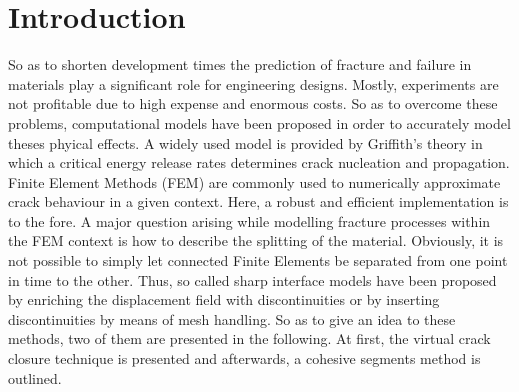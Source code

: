 \section{Introduction} \label{sec:intro}

So as to shorten development times the prediction of fracture and failure in materials play a significant role for engineering designs. Mostly, experiments are not profitable due to high expense and enormous costs. So as to overcome these problems, computational models have been proposed in order to accurately model theses phyical effects. A widely used model is provided by  Griffith's theory in which a critical energy release rates determines crack nucleation and propagation.
\\
Finite Element Methods (FEM) are commonly used to numerically approximate crack behaviour in a given context. Here, a robust and efficient implementation is to the fore. A major question arising while modelling fracture processes within the FEM context is how to describe the splitting of the material. Obviously, it is not possible to simply let connected Finite Elements be separated from one point in time to the other. Thus, so called sharp interface models have been proposed by enriching the displacement field with discontinuities or by inserting discontinuities by means of mesh handling. So as to give an idea to these methods, two of them are presented in the following. At first, the virtual crack closure technique is presented and afterwards, a cohesive segments method is outlined.

